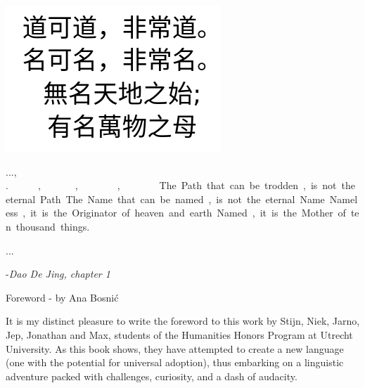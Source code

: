 \begin{center}{\it

	\includegraphics[scale=0.5]{./Images/Chinese.jpeg}
	\vspace{0.8cm} 

	\renewcommand{\corpsgrootte}{15pt}
\lol.\pe.\Atlanpi.\tom, \Atlanne.\si \lol.\tet. 

\na.\pe.\Atlanpi.\na, \Atlanne.\si \na.\tet. 

\si.\Atlanne.\Atlanpi.\na, \si \mi \ta.\som.\an.\tem. 

\si.\Atlanpi.\na, \si \Atlanfi.\pet \ta.\on.\mus 
\restorecorps

	\vspace{0.8cm} 

The Path that can be trodden, 

is not the eternal Path. 

The Name that can be named, 

is not the eternal Name. 

Nameless, it is the Originator  

of heaven and earth 

Named, it is the Mother  

of ten thousand things. 
}

...


-{\it Dao De Jing, chapter 1}

\end{center}


\pagebreak

{\Large Foreword - by Ana Bosni\'{c}}

\noindent It is my distinct pleasure to write the foreword to this work by Stijn, Niek, Jarno, Jep, Jonathan and Max, students of the Humanities Honors Program at Utrecht University. As this book shows, they have attempted to create a new language (one with the potential for universal adoption), thus embarking on a linguistic adventure packed with challenges, curiosity, and a dash of audacity.  

